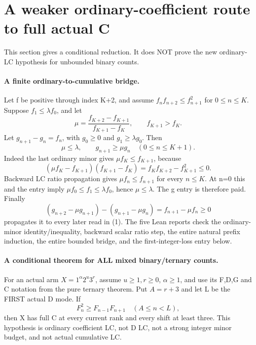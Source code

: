 \section{A weaker ordinary-coefficient route to full actual C}
This section gives a conditional reduction. It does NOT prove the
new ordinary-LC hypothesis for unbounded binary counts.

\paragraph{A finite ordinary-to-cumulative bridge.}
Let f be positive through index K+2, and assume
$f_nf_{n+2}\le f_{n+1}^2$ for $0\le n\le K$.
Suppose $f_1\le\lambda f_0$, and let
\[
 \mu=\frac{f_{K+2}-f_{K+1}}{f_{K+1}-f_K},\qquad f_{K+1}>f_K.
\]
Let $g_{n+1}-g_n=f_n$, with $g_0\ge0$ and
$g_1\ge\lambda g_0$. Then
\[
 \mu\le\lambda,\qquad g_{n+1}\ge\mu g_n\quad(0\le n\le K+1).
 \tag{1}
\]
Indeed the last ordinary minor gives
$\mu f_K\le f_{K+1}$, because
\[
 (\mu f_K-f_{K+1})(f_{K+1}-f_K)
                  =f_Kf_{K+2}-f_{K+1}^2\le0.
\]
Backward LC ratio propagation gives $\mu f_n\le f_{n+1}$
for every $n\le K$. At n=0 this and the entry imply
$\mu f_0\le f_1\le\lambda f_0$, hence $\mu\le\lambda$.
The g entry is therefore paid. Finally
\[
 (g_{n+2}-\mu g_{n+1})-(g_{n+1}-\mu g_n)
                                  =f_{n+1}-\mu f_n\ge0
\]
propagates it to every later read in (1). The five Lean reports
check the ordinary-minor identity/inequality, backward scalar
ratio step, the entire natural prefix induction, the entire bounded
bridge, and the first-integer-loss entry below.

\paragraph{A conditional theorem for ALL mixed binary/ternary counts.}
For an actual arm $X=1^\alpha2^u3^r$, assume $u\ge1,r\ge0$,
$\alpha\ge1$, and use its F,D,G and C notation from the pure
ternary theorem. Put $A=r+3$ and let L be the FIRST actual D mode.
If
\[
                 F_n^2\ge F_{n-1}F_{n+1}
                     \quad(A\le n<L),                 \tag{2}
\]
then X has full C at every current rank and every shift at least
three. This hypothesis is ordinary coefficient LC, not D LC,
not a strong integer minor budget, and not actual cumulative LC.

